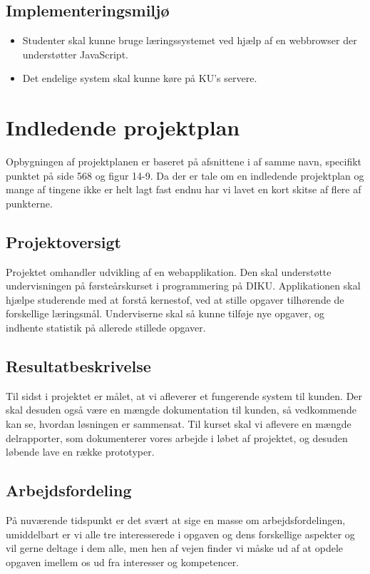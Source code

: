 \documentclass[12pt]{article}
\begin{document}
\subsection{Implementeringsmiljø}
\begin{itemize}
\item Studenter skal kunne bruge læringssystemet ved hjælp af en webbrowser der understøtter JavaScript.
\item Det endelige system skal kunne køre på KU's servere.
\end{itemize}

\section{Indledende projektplan}
Opbygningen af projektplanen er baseret på afsnittene i \cite{OOSE} af samme navn, specifikt punktet på side 568 og figur 14-9. Da der er tale om en indledende projektplan og mange af tingene ikke er helt lagt fast endnu har vi lavet en kort skitse af flere af punkterne.

\subsection{Projektoversigt}
Projektet omhandler udvikling af en webapplikation. Den skal understøtte undervisningen på førsteårskurset i programmering på DIKU. Applikationen skal hjælpe studerende med at forstå kernestof, ved at stille opgaver tilhørende de forskellige læringsmål. Underviserne skal så kunne tilføje nye opgaver, og indhente statistik på allerede stillede opgaver.
\subsection{Resultatbeskrivelse}
Til sidst i projektet er målet, at vi afleverer et fungerende system til kunden. Der skal desuden også være en mængde dokumentation til kunden, så vedkommende kan se, hvordan løsningen er sammensat.
Til kurset skal vi aflevere en mængde delrapporter, som dokumenterer vores arbejde i løbet af projektet, og desuden løbende lave en række prototyper.
\subsection{Arbejdsfordeling}
På nuværende tidspunkt er det svært at sige en masse om arbejdsfordelingen, umiddelbart er vi alle tre interesserede i opgaven og dens forskellige aspekter og vil gerne deltage i dem alle, men hen af vejen finder vi måske ud af at opdele opgaven imellem os ud fra interesser og kompetencer.
\end{document}
